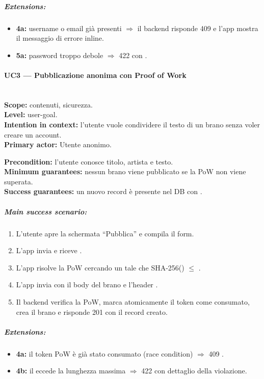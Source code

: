 \subparagraph{Extensions:}
\begin{itemize}
    \item \textbf{4a:} username o email già presenti $\Rightarrow$ il backend
    risponde 409 e l'app mostra il messaggio di errore inline.
    \item \textbf{5a:} password troppo debole $\Rightarrow$ 422 con
    .
\end{itemize}

\paragraph{UC3 --- Pubblicazione anonima con Proof of Work}\hfill\\
\textbf{Scope:} contenuti, sicurezza.\\
\textbf{Level:} user-goal.\\
\textbf{Intention in context:} l'utente vuole condividere il testo di un
brano senza voler creare un account.\\
\textbf{Primary actor:} Utente anonimo.

\textbf{Precondition:} l'utente conosce titolo, artista e testo.\\
\textbf{Minimum guarantees:} nessun brano viene pubblicato se la PoW non
viene superata.\\
\textbf{Success guarantees:} un nuovo record  è presente nel DB
con .

\subparagraph{Main success scenario:}
\begin{enumerate}
    \item L'utente apre la schermata ``Pubblica'' e compila il form.
    \item L'app invia  e riceve
    .
    \item L'app risolve la PoW cercando un  tale che
    SHA-256() $\leq$ .
    \item L'app invia  con il body del brano e
    l'header .
    \item Il backend verifica la PoW, marca atomicamente il token come
    consumato, crea il brano e risponde 201 con il record creato.
\end{enumerate}

\subparagraph{Extensions:}
\begin{itemize}
    \item \textbf{4a:} il token PoW è già stato consumato (race condition)
    $\Rightarrow$ 409 .
    \item \textbf{4b:} il  eccede la lunghezza massima
    $\Rightarrow$ 422 con dettaglio della violazione.
\end{itemize}

